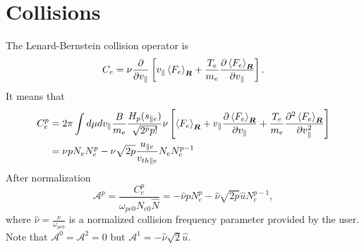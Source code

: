 \documentclass[final]{jpp}
\begin{document}
\section{Collisions}
The Lenard-Bernstein collision operator is 
\begin{equation}
    C_e = \nu \frac{\partial }{\partial v_\parallel}\left[v_\parallel \left< F_e \right>_{\bm{R}} + \frac{T_e}{m_e} \frac{\partial \left< F_e \right>_{\bm{R}}}{\partial v_\parallel} \right].
\end{equation}{}
It means that 
\begin{align}
    C_e^p &= 2 \pi \int d \mu d v_{\parallel} \frac{B}{m_e} \frac{H_p(s_{\parallel e})}{\sqrt{2^p p!}}
           \nu \left[\left< F_e \right>_{\bm{R}} + v_{\parallel} \frac{\partial \left< F_e \right>_{\bm{R}}}{\partial v_\parallel} + \frac{T_e}{m_e} \frac{\partial^2 \left< F_e \right>_{\bm{R}}}{\partial v_\parallel^2} \right] \nonumber \\
    &= \nu p N_e N_e^p - \nu \sqrt{2p} \frac{u_{\parallel e}}{v_{th \parallel e}} N_e N_e^{p-1}
\end{align}{}
After normalization
\begin{equation}
     \mathcal{A}^p = \frac{C_e^p}{\omega_{pe0}N_{e0}\hat{N}} = -\hat{\nu} p N_e^p - \hat{\nu} \sqrt{2p} \hat{u} N_e^{p-1},
\end{equation}{}
where $\hat{\nu} = \frac{\nu}{\omega_{pe0}}$ is a normalized collision frequency parameter provided by the user. Note that $\mathcal{A}^0=\mathcal{A}^2=0$ but $\mathcal{A}^1 = -\hat{\nu}\sqrt{2}\hat{u} $.

\end{document}
